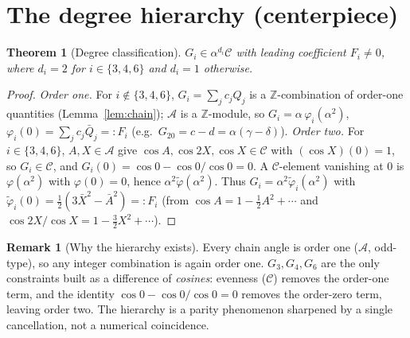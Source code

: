 \documentclass[11pt]{article}
\newtheorem{theorem}{Theorem}\newtheorem{lemma}{Lemma}
\theoremstyle{definition}\newtheorem{definition}{Definition}\newtheorem{remark}{Remark}
\begin{document}
\section{The degree hierarchy (centerpiece)}
\begin{theorem}[Degree classification]\label{thm:deg}
$G_i\in\alpha^{d_i}\mathcal C$ with leading coefficient $F_i\neq0$, where $d_i=2$ for
$i\in\{3,4,6\}$ and $d_i=1$ otherwise.
\end{theorem}
\begin{proof}
\emph{Order one.} For $i\notin\{3,4,6\}$, $G_i=\sum_jc_jQ_j$ is a $\mathbb Z$-combination
of order-one quantities (Lemma~\ref{lem:chain}); $\mathcal A$ is a $\mathbb Z$-module,
so $G_i=\alpha\,\varphi_i(\alpha^2)$, $\varphi_i(0)=\sum_jc_j\bar Q_j=:F_i$
(e.g.\ $G_{20}=c-d=\alpha(\gamma-\delta)$).
\emph{Order two.} For $i\in\{3,4,6\}$, $A,X\in\mathcal A$ give
$\cos A,\cos2X,\cos X\in\mathcal C$ with $(\cos X)(0)=1$, so $G_i\in\mathcal C$, and
$G_i(0)=\cos0-\cos0/\cos0=0$. A $\mathcal C$-element vanishing at $0$ is
$\varphi(\alpha^2)$ with $\varphi(0)=0$, hence $\alpha^2\tilde\varphi(\alpha^2)$. Thus
$G_i=\alpha^2\tilde\varphi_i(\alpha^2)$ with $\tilde\varphi_i(0)
=\tfrac12(3\bar X^2-\bar A^2)=:F_i$ (from $\cos A=1-\tfrac12A^2+\cdots$ and
$\cos2X/\cos X=1-\tfrac32X^2+\cdots$).
\end{proof}

\begin{remark}[Why the hierarchy exists]
Every chain angle is order one ($\mathcal A$, odd-type), so any integer combination is
again order one. $G_3,G_4,G_6$ are the only constraints built as a difference of
\emph{cosines}: evenness ($\mathcal C$) removes the order-one term, and the identity
$\cos0-\cos0/\cos0=0$ removes the order-zero term, leaving order two. The hierarchy is
a parity phenomenon sharpened by a single cancellation, not a numerical coincidence.
\end{remark}
\end{document}
